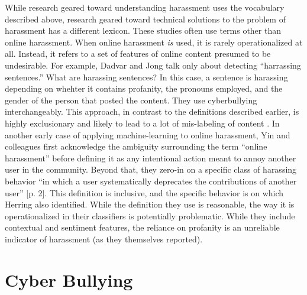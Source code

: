 \documentclass{sigchi}
\begin{document}
While research geared toward understanding harassment uses the vocabulary described above, research geared toward technical solutions to the problem of harassment has a different lexicon.  These studies often use terms other than online harassment.  When online harassment \textit{is} used, it is rarely operationalized at all.  Instead, it refers to a set of features of online content presumed to be undesirable.  For example, Dadvar and Jong \cite{Dadvar2012Cyberbullying} talk only about detecting ``harrassing sentences.''  What are harassing sentences?  In this case, a sentence is harassing depending on whehter it contains profanity, the pronouns employed, and the gender of the person that posted the content.  They use cyberbullying interchangeably.  This approach, in contrast to the definitions described earlier, is highly exclusionary and likely to lead to a lot of mis-labeling of content \cite{Guberman2017Challenges}.  In another early case of applying machine-learning to online harassment, Yin and colleagues \cite{Yin2009Detection} first acknowledge the ambiguity surrounding the term ``online harassment'' before defining it as any intentional action meant to annoy another user in the community.  Beyond that, they zero-in on a specific class of harassing behavior ``in which a user systematically deprecates the contributions of another user'' [p. 2].  This definition is inclusive, and the specific behavior is on which Herring \cite{Herring1999Rhetorical} also identified.  While the definition they use is reasonable, the way it is operationalized in their classifiers is potentially problematic.  While they include contextual and sentiment features, the reliance on profanity is an unreliable indicator of harassment (as they themselves reported).  

\section{Cyber Bullying}
\end{document}

